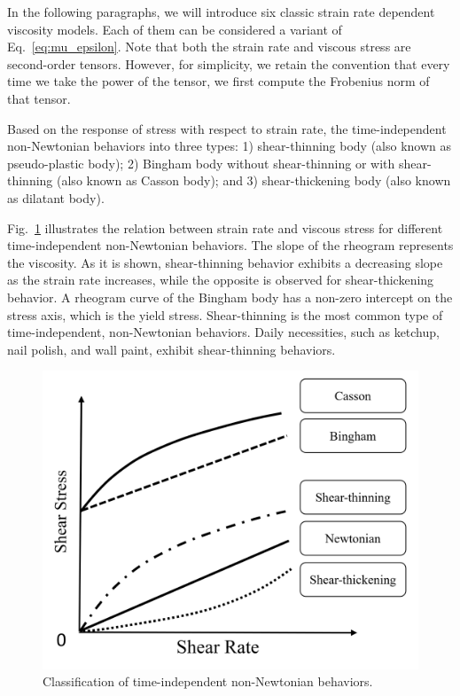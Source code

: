 \documentclass[10pt,journal,compsoc]{IEEEtran}
\begin{document}
In the following paragraphs, we will introduce six classic strain rate dependent viscosity models. Each of them can be considered a variant of Eq.~\ref{eq:mu_epsilon}. Note that both the strain rate and viscous stress are second-order tensors. However, for simplicity, we retain the convention that every time we take the power of the tensor, we first compute the Frobenius norm of that tensor.


Based on the response of stress with respect to strain rate, the time-independent non-Newtonian behaviors into three types: 1) shear-thinning body (also known as pseudo-plastic body); 2) Bingham body without shear-thinning or with shear-thinning (also known as Casson body); and 3) shear-thickening body (also known as dilatant body).


Fig.~\ref{fig:rheogram} illustrates the relation between strain rate and viscous stress for different time-independent non-Newtonian behaviors. The slope of the rheogram represents the viscosity. As it is shown, shear-thinning behavior exhibits a decreasing slope as the strain rate increases, while the opposite is observed for shear-thickening behavior. A rheogram curve of the Bingham body has a non-zero intercept on the stress axis, which is the yield stress. Shear-thinning is the most common type of time-independent, non-Newtonian behaviors. Daily necessities, such as ketchup, nail polish, and wall paint, exhibit shear-thinning behaviors.


\begin{figure}[htbp]
	\centering
	\includegraphics[width=0.8\linewidth]{pics/rheogram-new.png}
	\caption{Classification of time-independent non-Newtonian behaviors.}
	\label{fig:rheogram}
\end{figure}
\end{document}
